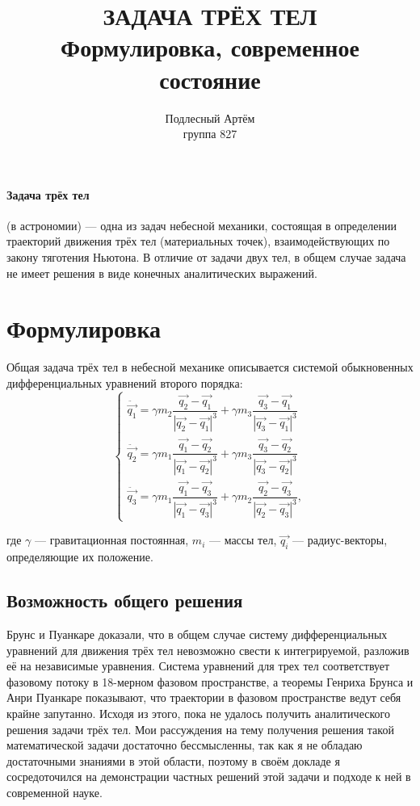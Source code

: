 \documentclass[a4paper, 12pt]{article}%
\author{Подлесный Артём \\ группа 827}
\title{ЗАДАЧА ТРЁХ ТЕЛ \\ Формулировка, современное состояние}
\begin{document}
\maketitle

\paragraph{Задача трёх тел}  (в астрономии) --- одна из задач небесной механики, состоящая в определении траекторий движения трёх тел (материальных точек), взаимодействующих по закону тяготения Ньютона. В отличие от задачи двух тел, в общем случае задача не имеет решения в виде конечных аналитических выражений.
\section{Формулировка}
Общая задача трёх тел в небесной механике описывается системой обыкновенных дифференциальных уравнений второго порядка:
\begin{equation}
\begin{cases}
\ddot{\vec{q_1}}=\gamma m_2\dfrac{\vec{q_2}-\vec{q_1}}{|\vec{q_2}-\vec{q_1}|^3}+\gamma m_3\dfrac{\vec{q_3}-\vec{q_1}}{|\vec{q_3}-\vec{q_1}|^3}\\
\ddot{\vec{q_2}}=\gamma m_1\dfrac{\vec{q_1}-\vec{q_2}}{|\vec{q_1}-\vec{q_2}|^3}+\gamma m_3\dfrac{\vec{q_3}-\vec{q_2}}{|\vec{q_3}-\vec{q_2}|^3}\\
\ddot{\vec{q_3}}=\gamma m_1\dfrac{\vec{q_1}-\vec{q_3}}{|\vec{q_1}-\vec{q_3}|^3}+\gamma m_2\dfrac{\vec{q_2}-\vec{q_3}}{|\vec{q_2}-\vec{q_3}|^3},
\end{cases}
\end{equation}

где $\gamma$  --- гравитационная постоянная, $m_i$ --- массы тел, $\vec{q_i}$ --- радиус-векторы, определяющие их положение.
\subsection{Возможность общего решения}
Брунс и Пуанкаре доказали, что в общем случае систему дифференциальных уравнений для движения трёх тел невозможно свести к интегрируемой, разложив её на независимые уравнения. Система уравнений для трех тел соответствует фазовому потоку в 18-мерном фазовом пространстве, а теоремы Генриха Брунса и Анри Пуанкаре показывают, что траектории в фазовом пространстве ведут себя крайне запутанно. Исходя из этого, пока не удалось получить аналитического решения задачи трёх тел. Мои рассуждения на тему получения решения такой математической задачи достаточно бессмысленны, так как я не обладаю достаточными знаниями в этой области, поэтому в своём докладе я сосредоточился на демонстрации частных решений этой задачи и подходе к ней в современной науке.
\end{document}
